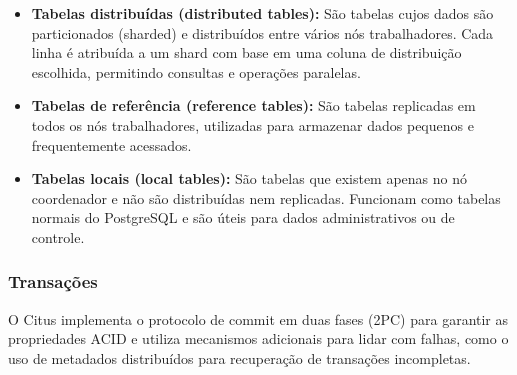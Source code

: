 \begin{itemize}
    \item \textbf{Tabelas distribuídas (distributed tables):} 
    São tabelas cujos dados são particionados (sharded) e distribuídos entre vários nós trabalhadores. Cada linha é atribuída a um shard com base em uma coluna de distribuição escolhida, permitindo consultas e operações paralelas.
    
    \item \textbf{Tabelas de referência (reference tables):} 
    São tabelas replicadas em todos os nós trabalhadores, utilizadas para armazenar dados pequenos e frequentemente acessados.
    
    \item \textbf{Tabelas locais (local tables):} 
    São tabelas que existem apenas no nó coordenador e não são distribuídas nem replicadas. Funcionam como tabelas normais do PostgreSQL e são úteis para dados administrativos ou de controle.
\end{itemize}

\subsubsection{Transações}
O Citus implementa o protocolo de commit em duas fases (2PC) para garantir as propriedades ACID e utiliza mecanismos adicionais para lidar com falhas, como o uso de metadados distribuídos para recuperação de transações incompletas.
